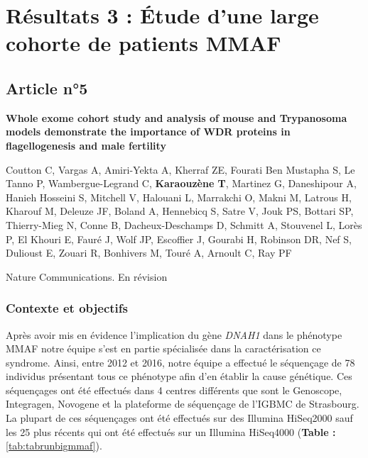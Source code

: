 \documentclass[12pt,a4paper,twoside]{ugathesis}
\theoremstyle{definition}
\theoremstyle{definition}
\theoremstyle{definition}
\theoremstyle{remark}
\begin{document}
\newpage  

\section{Résultats 3 : Étude d'une large cohorte de patients
MMAF}\label{resultats-3-etude-dune-large-cohorte-de-patients-mmaf}

\subsection{Article n°5}\label{article-n5}

\textbf{Whole exome cohort study and analysis of mouse and Trypanosoma
models demonstrate the importance of WDR proteins in flagellogenesis and
male fertility}

Coutton C, Vargas A, Amiri-Yekta A, Kherraf ZE, Fourati Ben Mustapha S,
Le Tanno P, Wambergue-Legrand C, \textbf{Karaouzène T}, Martinez G,
Daneshipour A, Hanieh Hosseini S, Mitchell V, Halouani L, Marrakchi O,
Makni M, Latrous H, Kharouf M, Deleuze JF, Boland A, Hennebicq S, Satre
V, Jouk PS, Bottari SP, Thierry-Mieg N, Conne B, Dacheux-Deschamps D,
Schmitt A, Stouvenel L, Lorès P, El Khouri E, Fauré J, Wolf JP,
Escoffier J, Gourabi H, Robinson DR, Nef S, Dulioust E, Zouari R,
Bonhivers M, Touré A, Arnoult C, Ray PF

Nature Communications. En révision

\newpage

\subsubsection{Contexte et objectifs}\label{contexte-et-objectifs-4}

Après avoir mis en évidence l'implication du gène \emph{DNAH1} dans le
phénotype MMAF notre équipe s'est en partie spécialisée dans la
caractérisation ce syndrome. Ainsi, entre 2012 et 2016, notre équipe a
effectué le séquençage de 78 individus présentant tous ce phénotype afin
d'en établir la cause génétique. Ces séquençages ont été effectués dans
4 centres différents que sont le Genoscope, Integragen, Novogene et la
plateforme de séquençage de l'IGBMC de Strasbourg. La plupart de ces
séquençages ont été effectués sur des Illumina HiSeq2000 sauf les 25
plus récents qui ont été effectués sur un Illumina HiSeq4000
(\textbf{Table : }\ref{tab:tabrunbigmmaf}).
\end{document}
